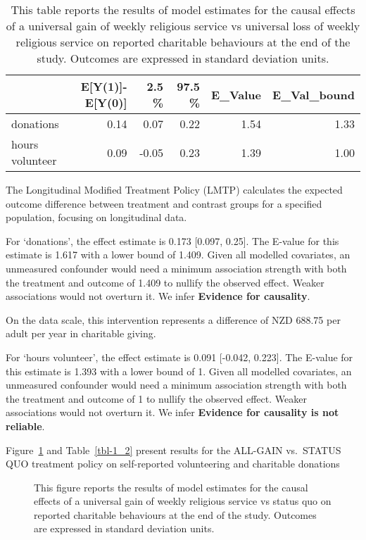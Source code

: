 \documentclass[
  single column]{article}
\begin{document}
\begin{longtable}[]{@{}lrrrrr@{}}

\caption{\label{tbl-1_1}This table reports the results of model
estimates for the causal effects of a universal gain of weekly religious
service vs universal loss of weekly religious service on reported
charitable behaviours at the end of the study. Outcomes are expressed in
standard deviation units.}

\tabularnewline

\toprule\noalign{}
& E{[}Y(1){]}-E{[}Y(0){]} & 2.5 \% & 97.5 \% & E\_Value &
E\_Val\_bound \\
\midrule\noalign{}
\endhead
\bottomrule\noalign{}
\endlastfoot
donations & 0.14 & 0.07 & 0.22 & 1.54 & 1.33 \\
hours volunteer & 0.09 & -0.05 & 0.23 & 1.39 & 1.00 \\

\end{longtable}

The Longitudinal Modified Treatment Policy (LMTP) calculates the
expected outcome difference between treatment and contrast groups for a
specified population, focusing on longitudinal data.

For `donations', the effect estimate is 0.173 {[}0.097, 0.25{]}. The
E-value for this estimate is 1.617 with a lower bound of 1.409. Given
all modelled covariates, an unmeasured confounder would need a minimum
association strength with both the treatment and outcome of 1.409 to
nullify the observed effect. Weaker associations would not overturn it.
We infer \textbf{Evidence for causality}.

On the data scale, this intervention represents a difference of NZD
688.75 per adult per year in charitable giving.

For `hours volunteer', the effect estimate is 0.091 {[}-0.042, 0.223{]}.
The E-value for this estimate is 1.393 with a lower bound of 1. Given
all modelled covariates, an unmeasured confounder would need a minimum
association strength with both the treatment and outcome of 1 to nullify
the observed effect. Weaker associations would not overturn it. We infer
\textbf{Evidence for causality is not reliable}.

\newpage{}

Figure~\ref{fig-1_2} and Table~\ref{tbl-1_2} present results for the
ALL-GAIN vs.~STATUS QUO treatment policy on self-reported volunteering
and charitable donations

\begin{figure}


\caption{\label{fig-1_2}This figure reports the results of model
estimates for the causal effects of a universal gain of weekly religious
service vs status quo on reported charitable behaviours at the end of
the study. Outcomes are expressed in standard deviation units.}

\end{figure}%
\end{document}
